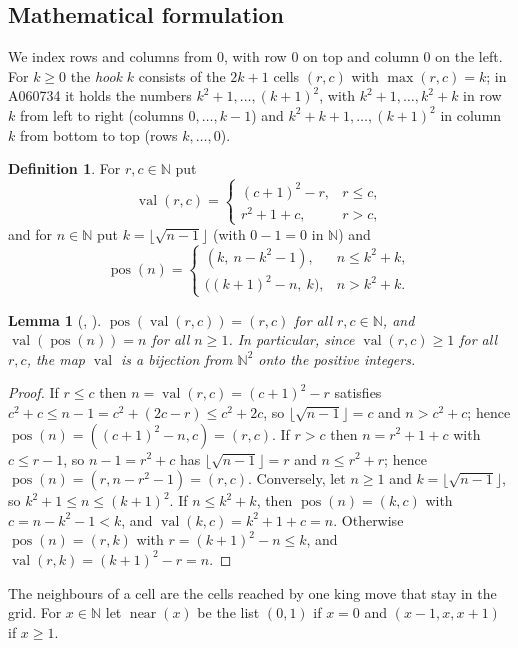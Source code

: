 \documentclass[11pt]{amsart}
\theoremstyle{plain}
\newtheorem{lemma}[theorem]{Lemma}
\theoremstyle{definition}
\newtheorem{definition}[theorem]{Definition}
\newcommand{\N}{\mathbb{N}}
\newcommand{\val}{\operatorname{val}}
\newcommand{\pos}{\operatorname{pos}}
\newcommand{\near}{\operatorname{near}}
\begin{document}
\subsection*{Mathematical formulation}
We index rows and columns from $0$, with row $0$ on top and column $0$ on the left.
For $k\ge0$ the \emph{hook} $k$ consists of the $2k+1$ cells $(r,c)$ with $\max(r,c)=k$; in A060734 it holds the numbers $k^2+1,\dots,(k+1)^2$, with $k^2+1,\dots,k^2+k$ in row $k$ from left to right (columns $0,\dots,k-1$) and $k^2+k+1,\dots,(k+1)^2$ in column $k$ from bottom to top (rows $k,\dots,0$).

\begin{definition}\label{def:array}
For $r,c\in\N$ put
\[
  \val(r,c)=\begin{cases}(c+1)^2-r, & r\le c,\\ r^2+1+c, & r>c,\end{cases}
\]
and for $n\in\N$ put $k=\lfloor\sqrt{n-1}\rfloor$ (with $0-1=0$ in $\N$) and
\[
  \pos(n)=\begin{cases}(k,\ n-k^2-1), & n\le k^2+k,\\ \bigl((k+1)^2-n,\ k\bigr), & n>k^2+k.\end{cases}
\]
\end{definition}

\begin{lemma}[, ]\label{lem:bij}
$\pos(\val(r,c))=(r,c)$ for all $r,c\in\N$, and $\val(\pos(n))=n$ for all $n\ge1$.
In particular, since $\val(r,c)\ge1$ for all $r,c$, the map $\val$ is a bijection from $\N^2$ onto the positive integers.
\end{lemma}

\begin{proof}
If $r\le c$ then $n=\val(r,c)=(c+1)^2-r$ satisfies $c^2+c\le n-1=c^2+(2c-r)\le c^2+2c$, so $\lfloor\sqrt{n-1}\rfloor=c$ and $n>c^2+c$; hence $\pos(n)=((c+1)^2-n,c)=(r,c)$.
If $r>c$ then $n=r^2+1+c$ with $c\le r-1$, so $n-1=r^2+c$ has $\lfloor\sqrt{n-1}\rfloor=r$ and $n\le r^2+r$; hence $\pos(n)=(r,n-r^2-1)=(r,c)$.
Conversely, let $n\ge1$ and $k=\lfloor\sqrt{n-1}\rfloor$, so $k^2+1\le n\le (k+1)^2$.
If $n\le k^2+k$, then $\pos(n)=(k,c)$ with $c=n-k^2-1<k$, and $\val(k,c)=k^2+1+c=n$.
Otherwise $\pos(n)=(r,k)$ with $r=(k+1)^2-n\le k$, and $\val(r,k)=(k+1)^2-r=n$.
\end{proof}

The neighbours of a cell are the cells reached by one king move that stay in the grid.
For $x\in\N$ let $\near(x)$ be the list $(0,1)$ if $x=0$ and $(x-1,x,x+1)$ if $x\ge1$.
\end{document}
